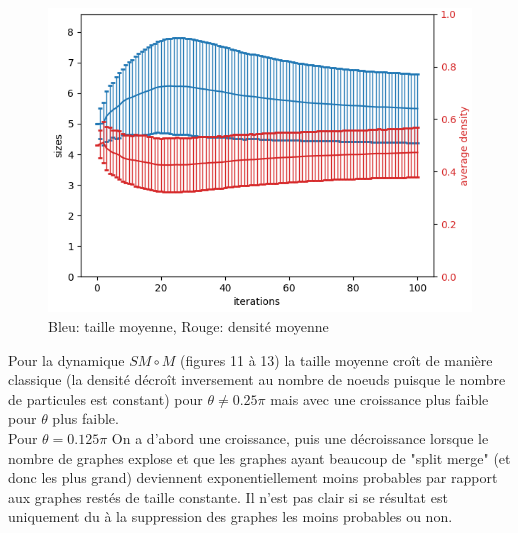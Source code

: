 \documentclass[11pts,french]{article}
\begin{document}
\begin{figure}[h!]
\begin{minipage}{0.33\textwidth}
\caption{$SM\circ M$, $\theta=0.25\pi$}
\end{minipage}
\begin{minipage}{0.33\textwidth}
\centering
\includegraphics[width=\textwidth, height=0.66\textwidth]{sizes/2_split_merge_move}
\caption{$SM\circ M$, $\theta=0.125\pi$}
\end{minipage}

\captionsetup{labelformat=empty}
\caption{Bleu: taille moyenne, Rouge: densité moyenne}

\end{figure}

Pour la dynamique $SM \circ M$ (figures 11 à 13) la taille moyenne croît de manière classique (la densité décroît inversement au nombre de noeuds puisque le nombre de particules est constant) pour $\theta \neq 0.25\pi$ mais avec une croissance plus faible pour $\theta$ plus faible. \\

Pour $\theta = 0.125\pi$ On a d'abord une croissance, puis une décroissance lorsque le nombre de graphes explose et que les graphes ayant beaucoup de "split merge" (et donc les plus grand) deviennent exponentiellement moins probables par rapport aux graphes restés de taille constante. Il n'est pas clair si se résultat est uniquement du à la suppression des graphes les moins probables ou non. \\
\end{document}
